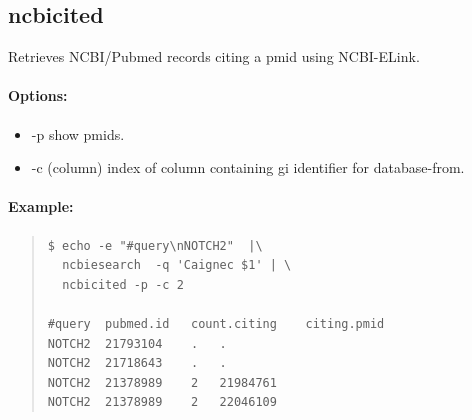 \documentclass[12pt]{article}
\begin{document}
\subsection{ncbicited}
Retrieves  NCBI/Pubmed records citing a pmid using NCBI-ELink.
\paragraph{Options:}
\begin{itemize}
\item-p show pmids.
\item-c (column) index of column containing gi identifier for database-from.
\end{itemize}
\paragraph{Example:}
\begin{quote}
\begin{verbatim}
$ echo -e "#query\nNOTCH2"  |\
  ncbiesearch  -q 'Caignec $1' | \
  ncbicited -p -c 2

#query	pubmed.id	count.citing	citing.pmid
NOTCH2	21793104	.	.
NOTCH2	21718643	.	.
NOTCH2	21378989	2	21984761
NOTCH2	21378989	2	22046109
\end{verbatim}
\end{quote}



\end{document}
